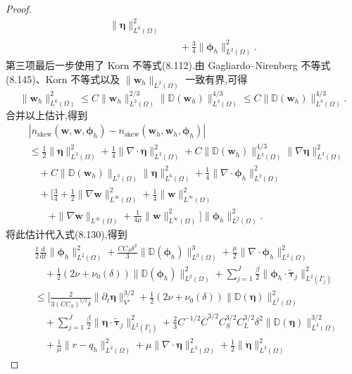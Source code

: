 \begin{theorem}
\begin{proof}
\[\begin{aligned}
 \|\symbf{\eta}\|_{L^6(\Omega)}^2\\
&\quad+\frac34\|\symbf{\phi}_h\|_{L^2(\Omega)}^2.
\end{aligned}
\]
第三项最后一步使用了 Korn 不等式(8.112).由 Gagliardo--Nirenberg 不等式(8.145)、Korn 不等式以及
$\|\bm{w}_h\|_{L^2(\Omega)}$ 一致有界,可得
\[
\|\bm{w}_h\|_{L^6(\Omega)}^2
\le C\|\bm{w}_h\|_{L^2(\Omega)}^{2/3}
       \|\mathbb{D}(\bm{w}_h)\|_{L^3(\Omega)}^{4/3}
\le C\|\mathbb{D}(\bm{w}_h)\|_{L^3(\Omega)}^{4/3}.
\]
合并以上估计,得到
\[
\begin{aligned}
&\left|
 n_{\mathrm{skew}}(\bm{w},\bm{w},\symbf{\phi}_h)
 -n_{\mathrm{skew}}(\bm{w}_h,\bm{w}_h,\symbf{\phi}_h)
 \right|\\
&\le\frac12\|\symbf{\eta}\|_{L^2(\Omega)}^2
 +\frac14\|\nabla\cdot\symbf{\eta}\|_{L^2(\Omega)}^2
 +C\|\mathbb{D}(\bm{w}_h)\|_{L^3(\Omega)}^{4/3}
   \|\nabla\symbf{\eta}\|_{L^3(\Omega)}^2\\
&\quad+C\|\mathbb{D}(\bm{w}_h)\|_{L^3(\Omega)}
   \|\symbf{\eta}\|_{L^6(\Omega)}^2
 +\frac14\|\nabla\cdot\symbf{\phi}_h\|_{L^2(\Omega)}^2\\
&\quad+\Biggl[
 \frac34+\frac12\|\nabla\bm{w}\|_{L^\infty(\Omega)}^2
 +\frac14\|\bm{w}\|_{L^\infty(\Omega)}^2\\
&\qquad+\|\nabla\bm{w}\|_{L^\infty(\Omega)}
 +\frac1{4\mu}\|\bm{w}\|_{L^\infty(\Omega)}^2
 \Biggr]\|\symbf{\phi}_h\|_{L^2(\Omega)}^2.
\end{aligned}
\]
将此估计代入式(8.130),得到
\[
\begin{aligned}
&\frac12\frac{\mathrm{d}}{\mathrm{d}t}
 \|\symbf{\phi}_h\|_{L^2(\Omega)}^2
 +\frac{CC_S\delta^2}{3}
 \|\mathbb{D}(\symbf{\phi}_h)\|_{L^3(\Omega)}^3
 +\frac\mu2\|\nabla\cdot\symbf{\phi}_h\|_{L^2(\Omega)}^2\\
&\quad+\frac12(2\nu+\nu_0(\delta))
 \|\mathbb{D}(\symbf{\phi}_h)\|_{L^2(\Omega)}^2
 +\sum_{j=1}^J\frac\beta2
 \|\symbf{\phi}_h\cdot\widetilde{\symbf{\tau}}_j\|_{L^2(\Gamma_j)}^2\\
&\le\Biggl[
 \frac{2}{3(CC_S)^{1/2}\delta}
 \|\partial_t\symbf{\eta}\|_{V'}^{3/2}
 +\frac12(2\nu+\nu_0(\delta))
 \|\mathbb{D}(\symbf{\eta})\|_{L^2(\Omega)}^2\\
&\quad+\sum_{j=1}^J\frac\beta2
 \|\symbf{\eta}\cdot\widetilde{\symbf{\tau}}_j\|_{L^2(\Gamma_j)}^2
 +\frac23 C^{-1/2}\overline C^{3/2}C_S^{3/2}C_L^{3/2}\delta^2
 \|\mathbb{D}(\symbf{\eta})\|_{L^3(\Omega)}^{3/2}\\
&\quad+\frac1\mu\|r-q_h\|_{L^2(\Omega)}^2
 +\mu\|\nabla\cdot\symbf{\eta}\|_{L^2(\Omega)}^2
 +\frac12\|\symbf{\eta}\|_{L^2(\Omega)}^2

\end{aligned}\]
\end{proof}
\end{theorem}
